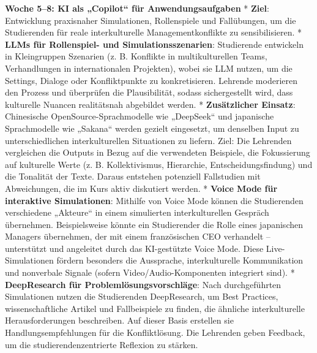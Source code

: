 \documentclass[
  ngerman,
  letterpaper,
  DIV=11]{scrreprt}
\begin{document}
\textbf{Woche 5--8: KI als „Copilot`` für Anwendungsaufgaben} *
\textbf{Ziel}: Entwicklung praxisnaher Simulationen, Rollenspiele und
Fallübungen, um die Studierenden für reale interkulturelle
Managementkonflikte zu sensibilisieren. * \textbf{LLMs für Rollenspiel-
und Simulationsszenarien}: Studierende entwickeln in Kleingruppen
Szenarien (z. B. Konflikte in multikulturellen Teams, Verhandlungen in
internationalen Projekten), wobei sie LLM nutzen, um die Settings,
Dialoge oder Konfliktpunkte zu konkretisieren. Lehrende moderieren den
Prozess und überprüfen die Plausibilität, sodass sichergestellt wird,
dass kulturelle Nuancen realitätsnah abgebildet werden. *
\textbf{Zusätzlicher Einsatz}: Chinesische OpenSource-Sprachmodelle wie
„DeepSeek`` und japanische Sprachmodelle wie „Sakana`` werden gezielt
eingesetzt, um denselben Input zu unterschiedlichen interkulturellen
Situationen zu liefern. Ziel: Die Lehrenden vergleichen die Outputs in
Bezug auf die verwendeten Beispiele, die Fokussierung auf kulturelle
Werte (z. B. Kollektivismus, Hierarchie, Entscheidungsfindung) und die
Tonalität der Texte. Daraus entstehen potenziell Fallstudien mit
Abweichungen, die im Kurs aktiv diskutiert werden. * \textbf{Voice Mode
für interaktive Simulationen}: Mithilfe von Voice Mode können die
Studierenden verschiedene „Akteure`` in einem simulierten
interkulturellen Gespräch übernehmen. Beispielsweise könnte ein
Studierender die Rolle eines japanischen Managers übernehmen, der mit
einem französischen CEO verhandelt -- unterstützt und angeleitet durch
das KI-gestützte Voice Mode. Diese Live-Simulationen fördern besonders
die Aussprache, interkulturelle Kommunikation und nonverbale Signale
(sofern Video/Audio-Komponenten integriert sind). * \textbf{DeepResearch
für Problemlösungsvorschläge}: Nach durchgeführten Simulationen nutzen
die Studierenden DeepResearch, um Best Practices, wissenschaftliche
Artikel und Fallbeispiele zu finden, die ähnliche interkulturelle
Herausforderungen beschreiben. Auf dieser Basis erstellen sie
Handlungsempfehlungen für die Konfliktlösung. Die Lehrenden geben
Feedback, um die studierendenzentrierte Reflexion zu stärken.
\end{document}
